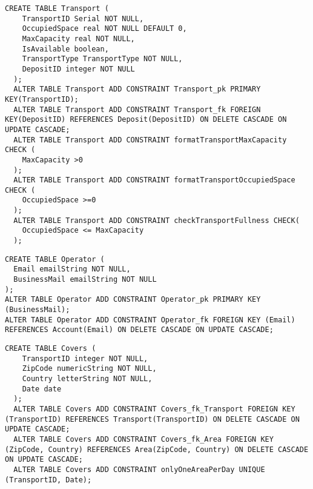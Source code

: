 \newpage
\begin{lstlisting}[caption={Creazione della tabella \textbf{Transport}}]
  CREATE TABLE Transport (
    TransportID Serial NOT NULL,
    OccupiedSpace real NOT NULL DEFAULT 0,
    MaxCapacity real NOT NULL,
    IsAvailable boolean, 
    TransportType TransportType NOT NULL,
    DepositID integer NOT NULL
  );
  ALTER TABLE Transport ADD CONSTRAINT Transport_pk PRIMARY KEY(TransportID);
  ALTER TABLE Transport ADD CONSTRAINT Transport_fk FOREIGN KEY(DepositID) REFERENCES Deposit(DepositID) ON DELETE CASCADE ON UPDATE CASCADE; 
  ALTER TABLE Transport ADD CONSTRAINT formatTransportMaxCapacity CHECK (
    MaxCapacity >0
  );
  ALTER TABLE Transport ADD CONSTRAINT formatTransportOccupiedSpace CHECK (
    OccupiedSpace >=0
  );
  ALTER TABLE Transport ADD CONSTRAINT checkTransportFullness CHECK(
    OccupiedSpace <= MaxCapacity
  );
\end{lstlisting}

\begin{lstlisting}[caption={Creazione della tabella \textbf{Operator}}]
  CREATE TABLE Operator (
  Email emailString NOT NULL,
  BusinessMail emailString NOT NULL
);
ALTER TABLE Operator ADD CONSTRAINT Operator_pk PRIMARY KEY (BusinessMail);
ALTER TABLE Operator ADD CONSTRAINT Operator_fk FOREIGN KEY (Email) REFERENCES Account(Email) ON DELETE CASCADE ON UPDATE CASCADE;
\end{lstlisting}

\begin{lstlisting}[caption={Creazione della tabella \textbf{Covers}}]
  CREATE TABLE Covers (
    TransportID integer NOT NULL,
    ZipCode numericString NOT NULL,
    Country letterString NOT NULL,
    Date date
  );
  ALTER TABLE Covers ADD CONSTRAINT Covers_fk_Transport FOREIGN KEY (TransportID) REFERENCES Transport(TransportID) ON DELETE CASCADE ON UPDATE CASCADE;
  ALTER TABLE Covers ADD CONSTRAINT Covers_fk_Area FOREIGN KEY (ZipCode, Country) REFERENCES Area(ZipCode, Country) ON DELETE CASCADE ON UPDATE CASCADE;
  ALTER TABLE Covers ADD CONSTRAINT onlyOneAreaPerDay UNIQUE (TransportID, Date);
\end{lstlisting}

